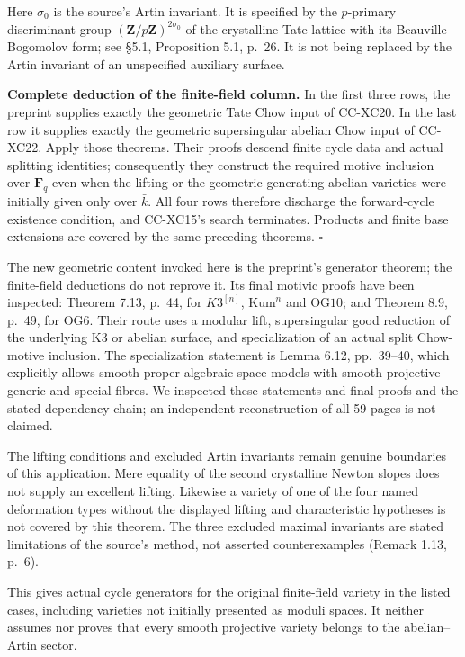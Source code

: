 Here \(\sigma_0\) is the source's Artin invariant. It is specified by
the \(p\)-primary discriminant group
\((\mathbf Z/p\mathbf Z)^{2\sigma_0}\) of the crystalline Tate lattice
with its Beauville--Bogomolov form; see §5.1, Proposition 5.1, p.~26. It
is not being replaced by the Artin invariant of an unspecified auxiliary
surface.

\textbf{Complete deduction of the finite-field column.} In the first
three rows, the preprint supplies exactly the geometric Tate Chow input
of CC-XC20. In the last row it supplies exactly the geometric
supersingular abelian Chow input of CC-XC22. Apply those theorems. Their
proofs descend finite cycle data and actual splitting identities;
consequently they construct the required motive inclusion over
\(\mathbf F_q\) even when the lifting or the geometric generating
abelian varieties were initially given only over \(\bar k\). All four
rows therefore discharge the forward-cycle existence condition, and
CC-XC15's search terminates. Products and finite base extensions are
covered by the same preceding theorems. \(\square\)

The new geometric content invoked here is the preprint's generator
theorem; the finite-field deductions do not reprove it. Its final
motivic proofs have been inspected: Theorem 7.13, p.~44, for
\(K3^{[n]}\), \(\mathrm{Kum}^n\) and \(\mathrm{OG10}\); and Theorem 8.9,
p.~49, for \(\mathrm{OG6}\). Their route uses a modular lift,
supersingular good reduction of the underlying K3 or abelian surface,
and specialization of an actual split Chow-motive inclusion. The
specialization statement is Lemma 6.12, pp.~39--40, which explicitly
allows smooth proper algebraic-space models with smooth projective
generic and special fibres. We inspected these statements and final
proofs and the stated dependency chain; an independent reconstruction of
all 59 pages is not claimed.

The lifting conditions and excluded Artin invariants remain genuine
boundaries of this application. Mere equality of the second crystalline
Newton slopes does not supply an excellent lifting. Likewise a variety
of one of the four named deformation types without the displayed lifting
and characteristic hypotheses is not covered by this theorem. The three
excluded maximal invariants are stated limitations of the source's
method, not asserted counterexamples (Remark 1.13, p.~6).

This gives actual cycle generators for the original finite-field variety
in the listed cases, including varieties not initially presented as
moduli spaces. It neither assumes nor proves that every smooth
projective variety belongs to the abelian--Artin sector.

